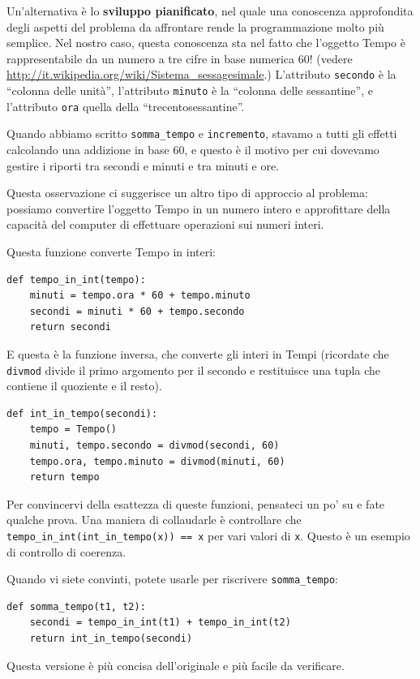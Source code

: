 \documentclass[10pt]{book}
\begin{document}
Un'alternativa è lo {\bf sviluppo pianificato}, nel quale una conoscenza approfondita degli aspetti del problema da affrontare rende la programmazione molto più semplice. Nel nostro caso, questa conoscenza sta nel fatto che l'oggetto Tempo è rappresentabile da un numero a tre cifre in base numerica 60! (vedere \url{http://it.wikipedia.org/wiki/Sistema_sessagesimale}.)  L'attributo
{\tt secondo} è la ``colonna delle unità'', l'attributo {\tt minuto}
è la ``colonna delle sessantine'', e l'attributo {\tt ora} quella della ``trecentosessantine''.

Quando abbiamo scritto \verb"somma_tempo" e {\tt incremento}, stavamo a tutti gli effetti calcolando una addizione in base 60, e questo è il motivo per cui dovevamo gestire i riporti tra secondi e minuti e tra minuti e ore.

Questa osservazione ci suggerisce un altro tipo di approccio al problema: possiamo convertire l'oggetto Tempo in un numero intero e approfittare della capacità del computer di effettuare operazioni sui numeri interi.

Questa funzione converte Tempo in interi:

\begin{verbatim}
def tempo_in_int(tempo):
    minuti = tempo.ora * 60 + tempo.minuto
    secondi = minuti * 60 + tempo.secondo
    return secondi
\end{verbatim}
%
E questa è la funzione inversa, che converte gli interi in Tempi (ricordate che {\tt divmod} divide il primo argomento per il secondo e restituisce una tupla che contiene il quoziente e il resto).

\begin{verbatim}
def int_in_tempo(secondi):
    tempo = Tempo()
    minuti, tempo.secondo = divmod(secondi, 60)
    tempo.ora, tempo.minuto = divmod(minuti, 60)
    return tempo
\end{verbatim}
%
Per convincervi della esattezza di queste funzioni, pensateci un po' su e fate qualche prova. Una maniera di collaudarle è controllare che \verb"tempo_in_int(int_in_tempo(x)) == x" per vari valori di {\tt x}. Questo è un esempio di controllo di coerenza.

Quando vi siete convinti, potete usarle per riscrivere \verb"somma_tempo":

\begin{verbatim}
def somma_tempo(t1, t2):
    secondi = tempo_in_int(t1) + tempo_in_int(t2)
    return int_in_tempo(secondi)
\end{verbatim}
%
Questa versione è più concisa dell'originale e più facile da verificare.
\end{document}
